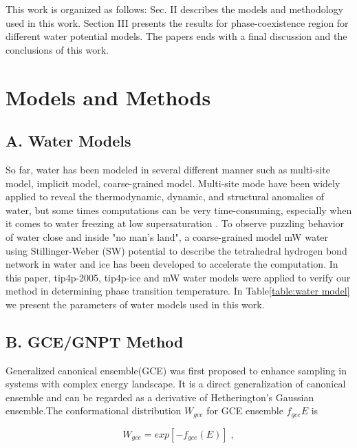 \documentclass[aps,prl,twocolumn,superscriptaddress]{revtex4-1}
\begin{document}
This work is organized as follows: Sec. II describes the models and methodology used in this work. Section III presents the results for phase-coexistence region for different water potential models. The papers ends with a final discussion and the conclusions of this work.
\section{Models and Methods} 
\subsection{A. Water Models}
So far, water has been modeled in several different manner such as multi-site model\cite{Sanz2004,Bryk2002,Horn2005,Gonzalez2010,Kumar2012,Sedlmeier2011,Vega2007,Yu2013,Himoto2011}, implicit model\cite{Huißmann2012}, coarse-grained model\cite{Molinero2009,Marrink2004Coarse}. Multi-site mode have been widely applied to reveal the thermodynamic, dynamic, and structural anomalies of water\cite{Gao2000,Bryk2002,Sanz2004}, but some times computations can be very time-consuming, especially when it comes to water freezing at low supersaturation\cite{Mishima1998} . To observe puzzling behavior of water close and inside "no man's land"\cite{Moore2011}, a coarse-grained model mW water\cite{Molinero2009} using Stillinger-Weber (SW) potential to describe the tetrahedral hydrogen bond network in water and ice has been developed to accelerate the computation. In this paper, tip4p-2005, tip4p-ice and mW water models were applied to verify our method in determining phase transition temperature. In Table\ref{table:water model}  we present the parameters of water models used in this work. 

\subsection{B. GCE/GNPT Method}

Generalized canonical ensemble(GCE)\cite{Xu2012} was first proposed to enhance sampling in systems with complex energy landscape. It is a direct generalization of canonical ensemble and can be regarded as a derivative of Hetherington's Gaussian ensemble.The conformational distribution $W_{gce}$ for GCE ensemble $f_{gce}{E}$ is

\begin{equation}
W_{gce}=exp[−f_{gce}(E)]\;,
\end{equation}
\end{document}

